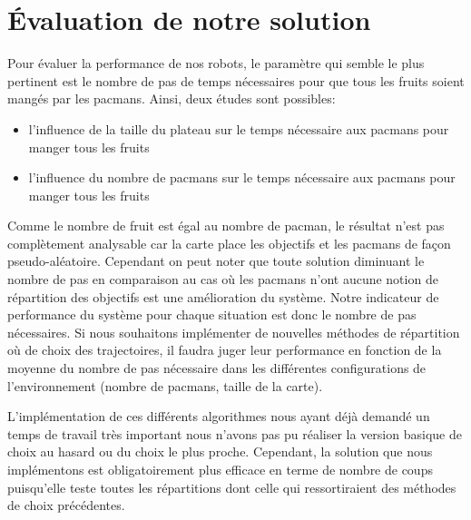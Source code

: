 \section{Évaluation de notre solution}
Pour évaluer la performance de nos robots, le paramètre qui semble le plus pertinent est le nombre de pas de temps nécessaires pour que tous les \glspl{fruit} soient mangés par les \glspl{pacman}.
Ainsi, deux études sont possibles:

\begin{itemize}
	\item l’influence de la taille du plateau sur le temps nécessaire aux \glspl{pacman} pour manger tous les \glspl{fruit}
	\item l’influence du nombre de \glspl{pacman} sur le temps nécessaire aux \glspl{pacman} pour manger tous les \glspl{fruit}
\end{itemize}

Comme le nombre de \gls{fruit} est égal au nombre de \gls{pacman}, le résultat n'est pas complètement analysable car la carte place les objectifs et les \glspl{pacman} de façon pseudo-aléatoire. Cependant on peut noter que toute solution diminuant le nombre de pas en comparaison au cas où les \glspl{pacman} n'ont aucune notion de répartition des objectifs est une amélioration du système. Notre indicateur de performance du système pour chaque situation est donc le nombre de pas nécessaires. Si nous souhaitons implémenter de nouvelles méthodes de répartition où de choix des trajectoires, il faudra juger leur performance en fonction de la moyenne du nombre de pas nécessaire dans les différentes configurations de l'environnement (nombre de \glspl{pacman}, taille de la carte).

L'implémentation de ces différents algorithmes nous ayant déjà demandé un temps de travail très important nous n'avons pas pu réaliser la version basique de choix au hasard ou du choix le plus proche. Cependant, la solution que nous implémentons est obligatoirement plus efficace en terme de nombre de coups puisqu'elle teste toutes les répartitions dont celle qui ressortiraient des méthodes de choix précédentes.

